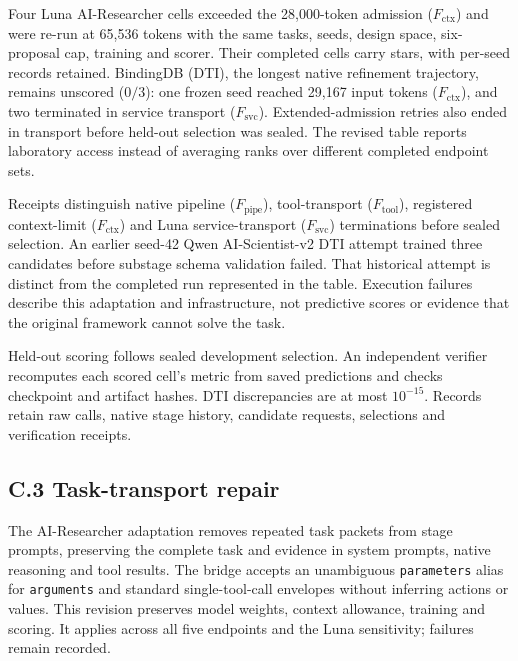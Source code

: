 Four Luna AI-Researcher cells exceeded the 28,000-token admission ($F_{\mathrm{ctx}}$) and were re-run at 65,536 tokens with the same tasks, seeds, design space, six-proposal cap, training and scorer. Their completed cells carry stars, with per-seed records retained. BindingDB (DTI), the longest native refinement trajectory, remains unscored ($0/3$): one frozen seed reached 29,167 input tokens ($F_{\mathrm{ctx}}$), and two terminated in service transport ($F_{\mathrm{svc}}$). Extended-admission retries also ended in transport before held-out selection was sealed. The revised table reports laboratory access instead of averaging ranks over different completed endpoint sets.

Receipts distinguish native pipeline ($F_{\mathrm{pipe}}$), tool-transport ($F_{\mathrm{tool}}$), registered context-limit ($F_{\mathrm{ctx}}$) and Luna service-transport ($F_{\mathrm{svc}}$) terminations before sealed selection. An earlier seed-42 Qwen AI-Scientist-v2 DTI attempt trained three candidates before substage schema validation failed. That historical attempt is distinct from the completed run represented in the table. Execution failures describe this adaptation and infrastructure, not predictive scores or evidence that the original framework cannot solve the task.

Held-out scoring follows sealed development selection. An independent verifier recomputes each scored cell's metric from saved predictions and checks checkpoint and artifact hashes. DTI discrepancies are at most $10^{-15}$. Records retain raw calls, native stage history, candidate requests, selections and verification receipts.

\subsection*{C.3 Task-transport repair}
The AI-Researcher adaptation removes repeated task packets from stage prompts, preserving the complete task and evidence in system prompts, native reasoning and tool results. The bridge accepts an unambiguous \texttt{parameters} alias for \texttt{arguments} and standard single-tool-call envelopes without inferring actions or values. This revision preserves model weights, context allowance, training and scoring. It applies across all five endpoints and the Luna sensitivity; failures remain recorded.

